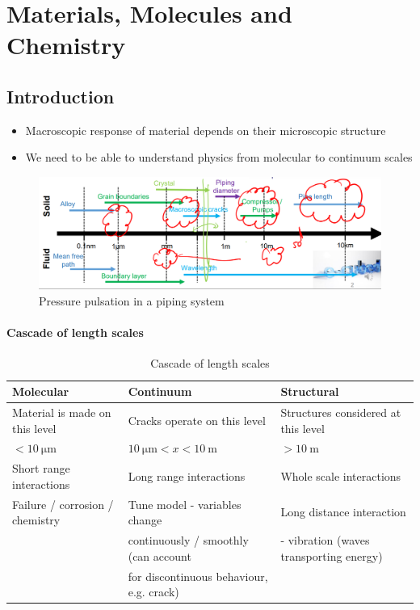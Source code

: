 \chapter{Materials, Molecules and Chemistry}
\section{Introduction}
\begin{itemize}
	\item Macroscopic response of material depends on their microscopic structure
	\item We need to be able to understand physics from molecular to continuum scales
\end{itemize}
\begin{figure}[H]
	\centering
	\includegraphics[width = \textwidth]{./img/figure1.png}
	\caption{Pressure pulsation in a piping system}
\end{figure}
\subsubsection{Cascade of length scales}
\begin{table}
	\begin{adjustbox}{width=\columnwidth,center}
		\begin{tabular}{@{}lll@{}}
			\toprule
			\textbf{Molecular}              & \textbf{Continuum}                            & \textbf{Structural}                     \\
			\midrule
			Material is made on this level  & Cracks operate on this level                  & Structures considered at this level     \\
			$< \SI{10}{\micro\meter}$       & $\SI{10}{\micro\meter} < x < \SI{10}{\meter}$ & $> \SI{10}{\meter}$                     \\
			Short range interactions        & Long range interactions                       & Whole scale interactions                \\
			Failure / corrosion / chemistry & Tune model - variables change                 & Long distance interaction               \\
			                                & continuously / smoothly (can account          & - vibration (waves transporting energy) \\
			                                & for discontinuous behaviour, e.g. crack)      &                                         \\
			\bottomrule
		\end{tabular}
	\end{adjustbox}
	\caption{Cascade of length scales}
\end{table}
